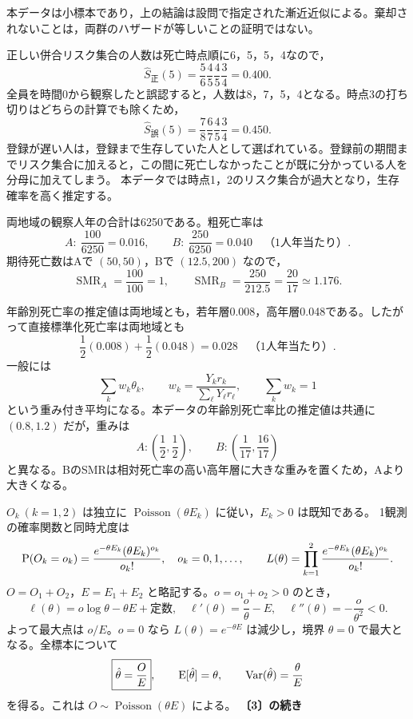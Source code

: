 \documentclass[a4paper,11pt]{ltjsarticle}
\begin{document}
本データは小標本であり，上の結論は設問で指定された漸近近似による。棄却されないことは，両群のハザードが等しいことの証明ではない。

正しい併合リスク集合の人数は死亡時点順に6，5，5，4なので，
\[
\hat S_{\mathrm{正}}(5)=\frac56\frac45\frac45\frac34=\boxed{0.400}.
\]
全員を時間0から観察したと誤認すると，人数は8，7，5，4となる。時点3の打ち切りはどちらの計算でも除くため，
\[
\hat S_{\mathrm{誤}}(5)=\frac78\frac67\frac45\frac34=\boxed{0.450}.
\]
登録が遅い人は，登録まで生存していた人として選ばれている。登録前の期間までリスク集合に加えると，この間に死亡しなかったことが既に分かっている人を分母に加えてしまう。
本データでは時点1，2のリスク集合が過大となり，生存確率を高く推定する。
\newpage

両地域の観察人年の合計は6250である。粗死亡率は
\[
A:\ \frac{100}{6250}=\boxed{0.016},\qquad
B:\ \frac{250}{6250}=\boxed{0.040}\quad\text{（1人年当たり）}.
\]
期待死亡数はAで $(50,50)$，Bで $(12.5,200)$ なので，
\[
\operatorname{SMR}_A=\frac{100}{100}=\boxed{1},\qquad
\operatorname{SMR}_B=\frac{250}{212.5}=\boxed{\frac{20}{17}\simeq1.176}.
\]

年齢別死亡率の推定値は両地域とも，若年層0.008，高年層0.048である。したがって直接標準化死亡率は両地域とも
\[
\frac12(0.008)+\frac12(0.048)=\boxed{0.028}\quad\text{（1人年当たり）}.
\]
一般には
\[
\sum_kw_k\theta_k,\qquad w_k=\frac{Y_kr_k}{\sum_\ell Y_\ell r_\ell},\qquad \sum_kw_k=1
\]
という重み付き平均になる。本データの年齢別死亡率比の推定値は共通に $(0.8,1.2)$ だが，重みは
\[
A:\left(\frac12,\frac12\right),\qquad
B:\left(\frac1{17},\frac{16}{17}\right)
\]
と異なる。BのSMRは相対死亡率の高い高年層に大きな重みを置くため，Aより大きくなる。

$O_k\ (k=1,2)$ は独立に $\operatorname{Poisson}(\theta E_k)$ に従い，$E_k>0$ は既知である。
1観測の確率関数と同時尤度は
\[
\operatorname{P}(O_k=o_k)=\frac{e^{-\theta E_k}(\theta E_k)^{o_k}}{o_k!},\quad o_k=0,1,\ldots,
\qquad
L(\theta)=\prod_{k=1}^2\frac{e^{-\theta E_k}(\theta E_k)^{o_k}}{o_k!}.
\]
$O=O_1+O_2$，$E=E_1+E_2$ と略記する。$o=o_1+o_2>0$ のとき，
\[
\ell(\theta)=o\log\theta-\theta E+\text{定数},\quad
\ell'(\theta)=\frac{o}{\theta}-E,\quad
\ell''(\theta)=-\frac{o}{\theta^2}<0.
\]
よって最大点は $o/E$。$o=0$ なら $L(\theta)=e^{-\theta E}$ は減少し，境界 $\theta=0$ で最大となる。全標本について
\[
\boxed{\hat\theta=\frac OE},\qquad
\operatorname{E}[\hat\theta]=\theta,\qquad
\operatorname{Var}(\hat\theta)=\frac{\theta}{E}
\]
を得る。これは $O\sim\operatorname{Poisson}(\theta E)$ による。
\newpage
{}
\noindent\textbf{〔3〕の続き}
\end{document}
